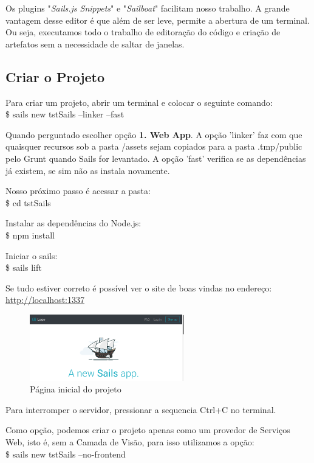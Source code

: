 \documentclass[a4paper,11pt]{article}
\begin{document}
Os plugins "\textit{Sails.js Snippets}" e "\textit{Sailboat}" facilitam nosso trabalho. A grande vantagem desse editor é que além de ser leve, permite a abertura de um terminal. Ou seja, executamos todo o trabalho de editoração do código e criação de artefatos sem a necessidade de saltar de janelas.

\subsection{Criar o Projeto}
Para criar um projeto, abrir um terminal e colocar o seguinte comando: \\
{\ttfamily\$ sails new tstSails --linker --fast}

Quando perguntado escolher opção \textbf{1. Web App}. A opção 'linker' faz com que quaisquer recursos sob a pasta /assets sejam copiados para a pasta .tmp/public pelo Grunt quando Sails for levantado. A opção 'fast' verifica se as dependências já existem, se sim não as instala novamente. 

Nosso próximo passo é acessar a pasta: \\
{\ttfamily\$ cd tstSails}

Instalar as dependências do Node.js: \\
{\ttfamily\$ npm install}

Iniciar o sails: \\
{\ttfamily\$ sails lift}

Se tudo estiver correto é possível ver o site de boas vindas no endereço:
\url{http://localhost:1337}
\begin{figure}[H]
	\centering
	\includegraphics[width=0.6\textwidth]{imagens/paginaInicial.png}
	\caption{Página inicial do projeto}
\end{figure}

Para interromper o servidor, pressionar a sequencia {\ttfamily Ctrl+C} no terminal.

Como opção, podemos criar o projeto apenas como um provedor de Serviços Web, isto é, sem a Camada de Visão, para isso utilizamos a opção: \\
{\ttfamily\$ sails new tstSails --no-frontend}
\end{document}
